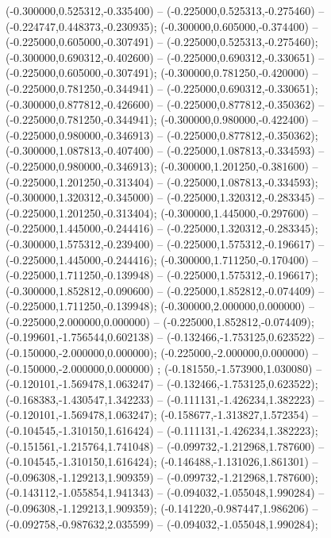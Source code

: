  (-0.300000,0.525312,-0.335400) -- (-0.225000,0.525313,-0.275460) -- (-0.224747,0.448373,-0.230935);
 (-0.300000,0.605000,-0.374400) -- (-0.225000,0.605000,-0.307491) -- (-0.225000,0.525313,-0.275460);
 (-0.300000,0.690312,-0.402600) -- (-0.225000,0.690312,-0.330651) -- (-0.225000,0.605000,-0.307491);
 (-0.300000,0.781250,-0.420000) -- (-0.225000,0.781250,-0.344941) -- (-0.225000,0.690312,-0.330651);
 (-0.300000,0.877812,-0.426600) -- (-0.225000,0.877812,-0.350362) -- (-0.225000,0.781250,-0.344941);
 (-0.300000,0.980000,-0.422400) -- (-0.225000,0.980000,-0.346913) -- (-0.225000,0.877812,-0.350362);
 (-0.300000,1.087813,-0.407400) -- (-0.225000,1.087813,-0.334593) -- (-0.225000,0.980000,-0.346913);
 (-0.300000,1.201250,-0.381600) -- (-0.225000,1.201250,-0.313404) -- (-0.225000,1.087813,-0.334593);
 (-0.300000,1.320312,-0.345000) -- (-0.225000,1.320312,-0.283345) -- (-0.225000,1.201250,-0.313404);
 (-0.300000,1.445000,-0.297600) -- (-0.225000,1.445000,-0.244416) -- (-0.225000,1.320312,-0.283345);
 (-0.300000,1.575312,-0.239400) -- (-0.225000,1.575312,-0.196617) -- (-0.225000,1.445000,-0.244416);
 (-0.300000,1.711250,-0.170400) -- (-0.225000,1.711250,-0.139948) -- (-0.225000,1.575312,-0.196617);
 (-0.300000,1.852812,-0.090600) -- (-0.225000,1.852812,-0.074409) -- (-0.225000,1.711250,-0.139948);
 (-0.300000,2.000000,0.000000) -- (-0.225000,2.000000,0.000000) -- (-0.225000,1.852812,-0.074409);
 (-0.199601,-1.756544,0.602138) -- (-0.132466,-1.753125,0.623522) -- (-0.150000,-2.000000,0.000000);
 (-0.225000,-2.000000,0.000000) -- (-0.150000,-2.000000,0.000000) ;
 (-0.181550,-1.573900,1.030080) -- (-0.120101,-1.569478,1.063247) -- (-0.132466,-1.753125,0.623522);
 (-0.168383,-1.430547,1.342233) -- (-0.111131,-1.426234,1.382223) -- (-0.120101,-1.569478,1.063247);
 (-0.158677,-1.313827,1.572354) -- (-0.104545,-1.310150,1.616424) -- (-0.111131,-1.426234,1.382223);
 (-0.151561,-1.215764,1.741048) -- (-0.099732,-1.212968,1.787600) -- (-0.104545,-1.310150,1.616424);
 (-0.146488,-1.131026,1.861301) -- (-0.096308,-1.129213,1.909359) -- (-0.099732,-1.212968,1.787600);
 (-0.143112,-1.055854,1.941343) -- (-0.094032,-1.055048,1.990284) -- (-0.096308,-1.129213,1.909359);
 (-0.141220,-0.987447,1.986206) -- (-0.092758,-0.987632,2.035599) -- (-0.094032,-1.055048,1.990284);
